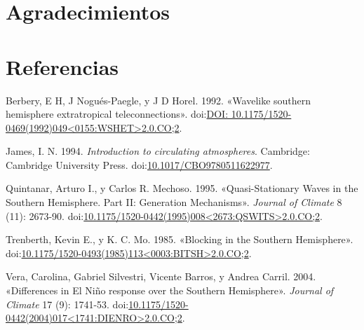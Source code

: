 \documentclass[spanish,a4paper]{book}
\begin{document}
\chapter{Agradecimientos}\label{agradecimientos}

\chapter*{Referencias}\label{referencias}

\hypertarget{refs}{}
\hypertarget{ref-Berbery1992}{}
Berbery, E H, J Nogués-Paegle, y J D Horel. 1992. «Wavelike southern
hemisphere extratropical teleconnections».
doi:\href{https://doi.org/DOI:\%2010.1175/1520-0469(1992)049\%3C0155:WSHET\%3E2.0.CO;2}{DOI: 10.1175/1520-0469(1992)049\textless{}0155:WSHET\textgreater{}2.0.CO;2}.

\hypertarget{ref-James}{}
James, I. N. 1994. \emph{Introduction to circulating atmospheres}.
Cambridge: Cambridge University Press.
doi:\href{https://doi.org/10.1017/CBO9780511622977}{10.1017/CBO9780511622977}.

\hypertarget{ref-Quintanar1995}{}
Quintanar, Arturo I., y Carlos R. Mechoso. 1995. «Quasi-Stationary Waves
in the Southern Hemisphere. Part II: Generation Mechanisms».
\emph{Journal of Climate} 8 (11): 2673-90.
doi:\href{https://doi.org/10.1175/1520-0442(1995)008\%3C2673:QSWITS\%3E2.0.CO;2}{10.1175/1520-0442(1995)008\textless{}2673:QSWITS\textgreater{}2.0.CO;2}.

\hypertarget{ref-Trenberth1985}{}
Trenberth, Kevin E., y K. C. Mo. 1985. «Blocking in the Southern
Hemisphere».
doi:\href{https://doi.org/10.1175/1520-0493(1985)113\%3C0003:BITSH\%3E2.0.CO;2}{10.1175/1520-0493(1985)113\textless{}0003:BITSH\textgreater{}2.0.CO;2}.

\hypertarget{ref-Vera2004}{}
Vera, Carolina, Gabriel Silvestri, Vicente Barros, y Andrea Carril.
2004. «Differences in El Niño response over the Southern Hemisphere».
\emph{Journal of Climate} 17 (9): 1741-53.
doi:\href{https://doi.org/10.1175/1520-0442(2004)017\%3C1741:DIENRO\%3E2.0.CO;2}{10.1175/1520-0442(2004)017\textless{}1741:DIENRO\textgreater{}2.0.CO;2}.
\end{document}
